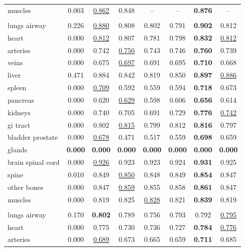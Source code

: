 \begin{minipage}{\textwidth}
{\begin{tabular}{@{}lccccccc@{}}
muscles & 0.003 & \underline{0.862} & 0.848 & -- & -- & \textbf{0.876} & -- \\
\addlinespace
\multicolumn{8}{@{}l}{\textit{joint}} \\
lungs airway & 0.226 & \underline{0.880} & 0.808 & 0.802 & 0.791 & \textbf{0.902} & 0.812 \\
heart & 0.000 & \underline{0.812} & 0.807 & 0.781 & 0.798 & \textbf{0.832} & \underline{0.812} \\
arteries & 0.000 & 0.742 & \underline{0.750} & 0.743 & 0.746 & \textbf{0.760} & 0.739 \\
veins & 0.000 & 0.675 & \underline{0.697} & 0.691 & 0.695 & \textbf{0.710} & 0.668 \\
liver & 0.471 & 0.884 & 0.842 & 0.819 & 0.850 & \textbf{0.897} & \underline{0.886} \\
spleen & 0.000 & \underline{0.709} & 0.592 & 0.559 & 0.594 & \textbf{0.718} & 0.673 \\
pancreas & 0.000 & 0.620 & \underline{0.629} & 0.598 & 0.606 & \textbf{0.656} & 0.614 \\
kidneys & 0.000 & 0.740 & 0.705 & 0.691 & 0.729 & \textbf{0.776} & \underline{0.742} \\
gi tract & 0.000 & 0.802 & \underline{0.815} & 0.799 & 0.812 & \textbf{0.816} & 0.797 \\
bladder prostate & 0.000 & \underline{0.678} & 0.471 & 0.517 & 0.559 & \textbf{0.698} & 0.659 \\
glands & \textbf{0.000} & \textbf{0.000} & \textbf{0.000} & \textbf{0.000} & \textbf{0.000} & \textbf{0.000} & \textbf{0.000} \\
brain spinal cord & 0.000 & \underline{0.926} & 0.923 & 0.923 & 0.924 & \textbf{0.931} & 0.925 \\
spine & 0.010 & 0.849 & \underline{0.850} & 0.848 & 0.849 & \textbf{0.854} & 0.847 \\
other bones & 0.000 & 0.847 & \underline{0.859} & 0.855 & 0.858 & \textbf{0.861} & 0.847 \\
muscles & 0.000 & 0.819 & 0.825 & \underline{0.828} & 0.821 & \textbf{0.839} & 0.819 \\
\addlinespace
\multicolumn{8}{@{}l}{\textit{joint (8000 steps)}} \\
lungs airway & 0.170 & \textbf{0.802} & 0.789 & 0.756 & 0.793 & 0.792 & \underline{0.795} \\
heart & 0.000 & 0.775 & 0.730 & 0.736 & 0.727 & \textbf{0.784} & \underline{0.776} \\
arteries & 0.000 & \underline{0.689} & 0.673 & 0.665 & 0.659 & \textbf{0.711} & 0.685 \\

\end{tabular}}
\end{minipage}
